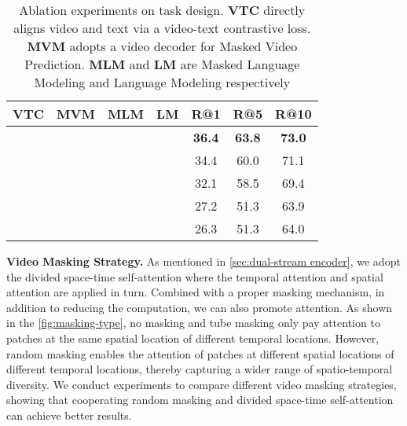 \documentclass[10pt,twocolumn,letterpaper]{article}
\begin{document}
\begin{table}[h]
\centering
\small
\begin{tabular}{@{}cccc|ccc@{}}
\toprule
\textbf{VTC}  &  \textbf{MVM} & \textbf{MLM} & \textbf{LM} &  \textbf{R@1}   & \textbf{R@5}    & \textbf{R@10}     \\ \midrule
 &                  &      &             & \textbf{36.4}      & \textbf{63.8}      & \textbf{73.0}    \\
 &      &      &          & 34.4  & 60.0  & 71.1         \\
  &    &     &           &32.1 &  58.5 &  69.4         \\
  &    &     &           &27.2 &  51.3 &  63.9         \\
 &  &    &     &26.3 &  51.3 & 64.0      \\ \bottomrule
\end{tabular}
\caption{Ablation experiments on task design. \textbf{VTC} directly aligns video and text via a video-text contrastive loss. \textbf{MVM} adopts a video decoder for Masked Video Prediction. \textbf{MLM} and \textbf{LM} are Masked Language Modeling and Language Modeling respectively }
\label{tab:task-ablations}
\end{table}

\vspace{1mm}\noindent\textbf{Video Masking Strategy.} As mentioned in \cref{sec:dual-stream encoder}, we adopt the divided space-time self-attention where the temporal attention and spatial attention are applied in turn. Combined with a proper masking mechanism, in addition to reducing the computation, we can also promote attention. As shown in the \cref{fig:masking-type}, no masking and tube masking only pay attention to patches at the same spatial location of different temporal locations. However, random masking enables the attention of patches at different spatial locations of different temporal locations, thereby capturing a wider range of spatio-temporal diversity. We conduct experiments to compare different video masking strategies, showing that cooperating random masking and divided space-time self-attention can achieve better results.
\end{document}
